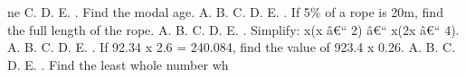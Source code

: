 \documentclass{article}
\begin{document}
\begin{multicols}{2}
ne \indent C. \newline \indent D. \newline \indent E.  \newline{}. Find the modal age. \newline \indent A. \newline \indent B. \newline \indent C. \newline \indent D. \newline \indent E.  \newline{}. If 5\% of a rope is 20m, find the full length of the rope. \newline \indent A. \newline \indent B. \newline \indent C. \newline \indent D. \newline \indent E.  \newline{}. Simplify: x(x â€“ 2) â€“ x(2x â€“ 4). \newline \indent A. \newline \indent B. \newline \indent C. \newline \indent D. \newline \indent E.  \newline{}. If 92.34 x 2.6 = 240.084, find the value of 923.4 x 0.26. \newline \indent A. \newline \indent B. \newline \indent C. \newline \indent D. \newline \indent E.  \newline{}.  Find the least whole number wh
\end{multicols}
\end{document}
